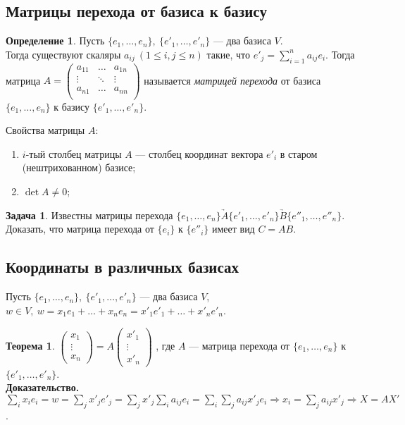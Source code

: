 \documentclass[a4paper]{article}
\theoremstyle{definition}
\newtheorem{theorem}{Теорема}
\newtheorem{definition}{Определение}
\newtheorem{problem}{Задача}
\begin{document}
\subsection{Матрицы перехода от базиса к базису}
\begin{definition}
	Пусть $\{e_1, \dots, e_n\}, \ \{e'_1, \dots, e'_n\}$ --- два базиса $V$. \\Тогда существуют скаляры $a_{ij} \ (1 \leq i, j \leq n)$ такие, что $e'_j = \sum \limits_{i = 1}^{n} a_{ij}e_i$. Тогда матрица $ A = \begin{pmatrix}
		a_{11} & \dots & a_{1n} \\
		\vdots & \ddots & \vdots \\
		a_{n1} & \dots & a_{nn} \\
  	\end{pmatrix}$ 
  называется \textit{матрицей перехода} от базиса $\{e_1, \dots, e_n\}$ к базису $\{e'_1, \dots, e'_n\}$.
\end{definition}

Свойства матрицы $A$: 
\begin{enumerate}
	\item $i$-тый столбец матрицы $A$ --- столбец координат вектора $e'_i$ в старом (нештрихованном) базисе;
	\item $\det A \neq 0$;
\end{enumerate}

\begin{problem}
	Известны матрицы перехода $\{e_1, \dots, e_n\}\underrightarrow{A}\{e'_1, \dots, e'_n\}\underrightarrow{B}\{e''_1, \dots, e''_n\}$. Доказать, что матрица перехода от $\{e_i\}$ к $\{e''_i\}$ имеет вид $C = AB$.
\end{problem}

\subsection{Координаты в различных базисах}
Пусть $\{e_1, \dots, e_n\}, \ \{e'_1, \dots, e'_n\}$ --- два базиса $V$, $w \in V, \ w = x_1e_1 + \dots + x_ne_n = x'_1e'_1 + \dots + x'_ne'_n$.
\begin{theorem}
	$
	\begin{pmatrix}
		x_1 \\
		\vdots \\
		x_n
	\end{pmatrix}
	= A
	\begin{pmatrix}
		x'_1 \\
		\vdots \\
		x'_n
	\end{pmatrix}
	$
	, где $A$ --- матрица перехода от $\{e_1, \dots, e_n\}$ к $\{e'_1, \dots, e'_n\}$.
	\\
	\textbf{Доказательство.} $\sum \limits_i x_i e_i = w = \sum \limits_j x'_j e'_j = \sum \limits_j x'_j \sum \limits_i a_{ij} e_i = \sum \limits_i \sum \limits_j a_{ij} x'_j e_i \Rightarrow x_i = \sum \limits_j a_{ij} x'_j \Rightarrow X = AX'$. \qedsymbol
\end{theorem}
\end{document}
